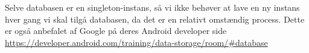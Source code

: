 Selve databasen er en singleton-instans, så vi ikke behøver at lave en ny instans hver gang vi skal tilgå databasen, da det er en relativt omstændig process. Dette er også anbefalet af Google på deres Android developer side \hyperlink{https://developer.android.com/training/data-storage/room/#database}{https://developer.android.com/training/data-storage/room/#database}

